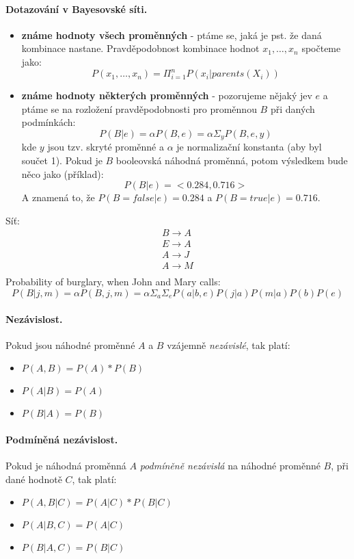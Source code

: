 \documentclass[a4paper]{article}      %
\newenvironment{example}[1][Příklad]{\begin{trivlist}
\item[\hskip \labelsep {\bfseries #1}]}{\end{trivlist}}
\begin{document}
\paragraph{Dotazování v Bayesovské síti.}
\begin{itemize}
\item \textbf{známe hodnoty všech proměnných} - ptáme se, jaká je pst. že daná kombinace nastane.
Pravděpodobnost kombinace hodnot $x_1,\ldots,x_n$ spočteme jako:
\[
P(x_1,\ldots,x_n) = \Pi_{i=1}^{n} P(x_i|parents(X_i))
\]
\item \textbf{známe hodnoty některých proměnných}
- pozorujeme nějaký jev $e$ a ptáme se na rozložení pravděpodobnosti pro proměnnou $B$ při daných podmínkách:
\[
P(B|e)= \alpha P(B,e) = \alpha \Sigma_{y} P(B,e,y)
\]
kde $y$ jsou tzv. skryté proměnné a $\alpha$ je normalizační konstanta (aby byl součet 1).
Pokud je $B$ booleovská náhodná proměnná, potom výsledkem bude něco jako (příklad):
\[
P(B|e) = <0.284,0.716>
\]
A znamená to, že $P(B=false|e) = 0.284$ a $P(B=true|e) = 0.716$.
\end{itemize}

\begin{example}
Síť:
\[
\begin{array}{c}
B \rightarrow A\\
E \rightarrow A\\
A \rightarrow J\\
A \rightarrow M\\
\end{array}
\]
Probability of burglary, when John and Mary calls:
\[
P(B|j,m) = \alpha P(B,j,m) = \alpha \Sigma_{a} \Sigma_{e} P(a|b,e)P(j|a)P(m|a)P(b)P(e)
\]
\end{example}

\paragraph{Nezávislost.} Pokud jsou náhodné proměnné $A$ a $B$ vzájemně \emph{nezávislé}, tak platí:
\begin{itemize}
\item $P(A,B) = P(A)*P(B)$
\item $P(A|B) = P(A)$
\item $P(B|A) = P(B)$
\end{itemize}

\paragraph{Podmíněná nezávislost.} Pokud je náhodná proměnná $A$ \emph{podmíněně nezávislá} na náhodné proměnné $B$, při dané hodnotě $C$, tak platí:
\begin{itemize}
\item $P(A,B|C) = P(A|C)*P(B|C)$
\item $P(A|B,C) = P(A|C)$
\item $P(B|A,C) = P(B|C)$
\end{itemize}
\end{document}
